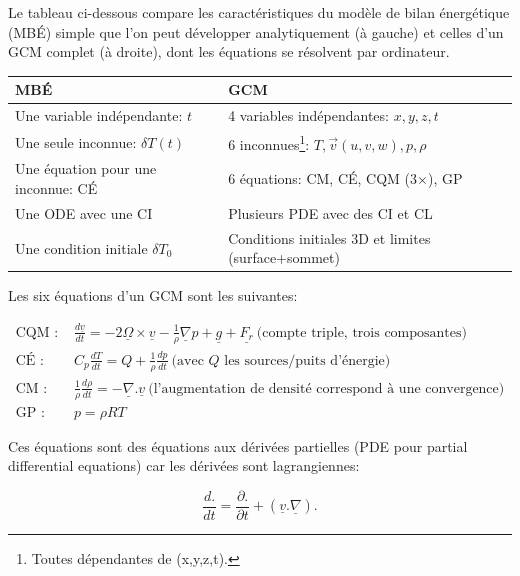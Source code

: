 \documentclass[a4paper,12pt]{article}
\begin{document}
Le tableau ci-dessous compare les caractéristiques du modèle de bilan
énergétique (MB\'E) simple que l'on peut développer analytiquement (à gauche)
et celles d'un GCM complet (à droite), dont les équations se résolvent par
ordinateur.

\begin{savenotes}
\begin{table}[h!]
\centering
\begin{tabular}{l|l}
\textbf{MB\'E} & \textbf{GCM} \\ \hline
Une variable indépendante: $t$ & 4 variables indépendantes: $x,y,z,t$ \\
Une seule inconnue: $\delta T(t)$ & 6 inconnues\footnote{Toutes dépendantes
de (x,y,z,t).}: $T,\vec{v}(u,v,w),p,\rho$ \\
Une équation pour une inconnue: C\'E & 6 équations: CM, C\'E, CQM
(3$\times$), GP \\
Une ODE avec une CI & Plusieurs PDE avec des CI et CL \\
Une condition initiale $\delta T_0$ & Conditions initiales 3D et limites
(surface+sommet) \\
\end{tabular}
\end{table}
\end{savenotes}

Les six équations d'un GCM sont les suivantes:

\begin{align}
\text{CQM~:~} & \frac{d\underline{v}}{dt} = -2\underline
{\Omega}\times\underline{v} - \frac{1}{\rho}\underline{\nabla} p + \underline
{g} + \underline{F_r} \ \text{(compte triple, trois composantes)} \\
\text{C\'E~:~} & C_p \frac{dT}{dt} = Q + \frac{1}{\rho}\frac{dp}{dt} \
\text{(avec $Q$ les sources/puits d'énergie)} \\
\text{CM~:~} & \frac{1}{\rho}\frac{d\rho}{dt} = -\underline
{\nabla}.\underline{v} \ \text{(l'augmentation de densité correspond à une
convergence)} \\
\text{GP~:~} & p = \rho R T
\end{align}

Ces équations sont des équations aux dérivées partielles (PDE pour partial
differential equations) car les dérivées sont lagrangiennes:

\begin{equation}
\frac{d .}{dt} = \frac{\partial . }{\partial t} + (\underline{v}.\underline
{\nabla}) .
\end{equation}
\end{document}
